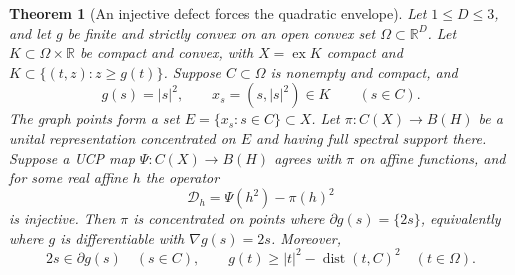 \documentclass[11pt,letterpaper]{amsart}
\newtheorem{theorem}{Theorem}[section]
\theoremstyle{definition}
\theoremstyle{remark}
\numberwithin{equation}{section}
\DeclareMathOperator{\ex}{ex}
\DeclareMathOperator{\dist}{dist}
\begin{document}
\begin{theorem}[An injective defect forces the quadratic envelope]
\label{prox:thm:envelope}
Let $1\le D\le3$, and let $g$ be finite and strictly convex on an
open convex set $\Omega\subset\mathbb R^D$.
Let $K\subset\Omega\times\mathbb R$ be compact and convex, with
$X=\ex K$ compact and $K\subset\{(t,z):z\ge g(t)\}$.
Suppose $C\subset\Omega$ is nonempty and compact, and
\[
 g(s)=|s|^2,\qquad x_s=(s,|s|^2)\in K\qquad(s\in C).
\]
The graph points form a set $E=\{x_s:s\in C\}\subset X$.
Let $\pi:C(X)\to B(H)$ be a unital representation concentrated
on $E$ and having full spectral support there.
Suppose a UCP map $\Psi:C(X)\to B(H)$ agrees with $\pi$ on
affine functions, and for some real affine $h$ the operator
\[
 \mathcal D_h=\Psi(h^2)-\pi(h)^2
\]
is injective. Then $\pi$ is concentrated on points where
$\partial g(s)=\{2s\}$, equivalently where $g$ is differentiable
with $\nabla g(s)=2s$. Moreover,
\begin{equation}\label{prox:eq:envelope}
 2s\in\partial g(s)\quad(s\in C),\qquad
 g(t)\ge|t|^2-\dist(t,C)^2\quad(t\in\Omega).
\end{equation}
\end{theorem}
\end{document}
